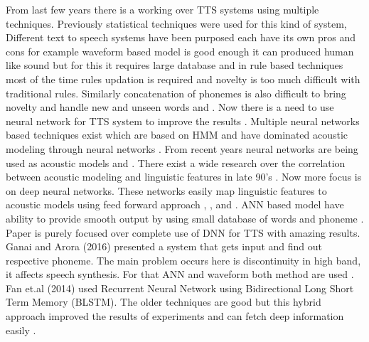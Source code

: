 From last few years there is a working over TTS systems using multiple techniques. Previously statistical techniques were
used for this kind of system, Different text to speech systems have been purposed each have its own pros and cons for
example waveform based model is good enough it can produced human like sound but for this it requires large database and
in rule based techniques most of the time rules updation is required and novelty is too much difficult with traditional rules.
Similarly concatenation of phonemes is also difficult to bring novelty and handle new and unseen words \cite{karaali1998text} and \cite{pitrelli2004tobi}. 
Now there is a need to use neural network for TTS system to improve the results \cite{muthukumar2016recurrent}. 
Multiple neural networks based techniques exist which are based on HMM and have dominated acoustic
modeling through neural networks \cite{tokuda2013speech}. From recent years neural networks are being used as acoustic models \cite{ling2015deep} and \cite{zen2015acoustic}. 
There exist a wide research over the correlation between acoustic modeling and linguistic
features in late 90's \cite{cawley1993lsp}. Now more focus is on deep neural networks. These
networks easily map linguistic features to acoustic models using feed forward approach \cite{lu2013combining}, \cite{qian2014training}, \cite{chen2015deep} and 
\cite{ze2013statistical}. ANN based model have
ability to provide smooth output by using small database of words and phoneme \cite{ganai2016text}. Paper \cite{muthukumar2016recurrent} 
is purely focused over complete use of DNN for TTS with amazing results. Ganai and Arora (2016) presented a system that gets input and find out 
respective phoneme. The main problem
occurs here is discontinuity in high band, it affects speech synthesis. For that ANN and waveform both method are used \cite{ganai2016text}. 
Fan et.al (2014) used Recurrent Neural Network using Bidirectional Long Short Term Memory
(BLSTM). The older techniques are good but this hybrid approach improved the results of experiments and can fetch deep
information easily \cite{fan2014tts}.